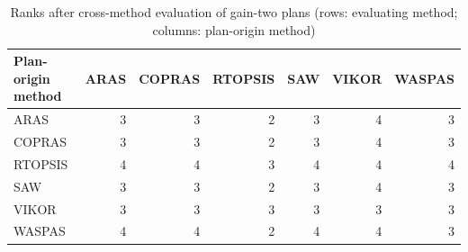 \begin{table}[htbp]
\centering
\caption{Ranks after cross-method evaluation of gain-two plans (rows: evaluating method; columns: plan-origin method)}
\label{tab:e3-cross-eval}
\begin{tabular}{lrrrrrr}
\toprule
Plan-origin method & ARAS & COPRAS & RTOPSIS & SAW & VIKOR & WASPAS \\
\midrule
ARAS & 3 & 3 & 2 & 3 & 4 & 3 \\
COPRAS & 3 & 3 & 2 & 3 & 4 & 3 \\
RTOPSIS & 4 & 4 & 3 & 4 & 4 & 4 \\
SAW & 3 & 3 & 2 & 3 & 4 & 3 \\
VIKOR & 3 & 3 & 3 & 3 & 3 & 3 \\
WASPAS & 4 & 4 & 2 & 4 & 4 & 3 \\
\bottomrule
\end{tabular}
\end{table}
